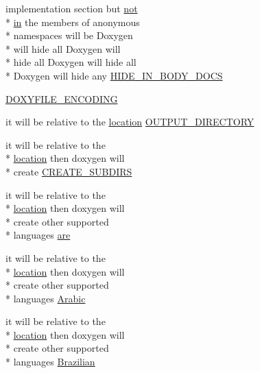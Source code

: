 \begin{DoxyCompactItemize}
implementation section but \hyperlink{uavobjecttemplate_8m_acf8758da9d0019183b0d213755711ee7}{not} \\*
\hyperlink{glext_8h_a83ad0ee7f1e06b59c90271716e689080}{in} the members of anonymous \\*
namespaces will be Doxygen \\*
will hide all Doxygen will \\*
hide all Doxygen will hide all \\*
Doxygen will hide any \hyperlink{sdlgamepad_8dox_aac21372812b1ce4b2d16b5121c56fff6}{H\-I\-D\-E\-\_\-\-I\-N\-\_\-\-B\-O\-D\-Y\-\_\-\-D\-O\-C\-S}
\item 
\hyperlink{sdlgamepad_8dox_ac50780facdab5a469895066bc087eea5}{D\-O\-X\-Y\-F\-I\-L\-E\-\_\-\-E\-N\-C\-O\-D\-I\-N\-G}
\item 
it will be relative to the \hyperlink{glext_8h_a6f0165ed903f22b8bb600c3e0b628e73}{location} \hyperlink{sdlgamepad_8dox_a0210526ada4ed067410fb4f078b8ae3f}{O\-U\-T\-P\-U\-T\-\_\-\-D\-I\-R\-E\-C\-T\-O\-R\-Y}
\item 
it will be relative to the \\*
\hyperlink{glext_8h_a6f0165ed903f22b8bb600c3e0b628e73}{location} then doxygen will \\*
create \hyperlink{sdlgamepad_8dox_a77f3c876623f3cbb5ed96ca49ce6fe06}{C\-R\-E\-A\-T\-E\-\_\-\-S\-U\-B\-D\-I\-R\-S}
\item 
it will be relative to the \\*
\hyperlink{glext_8h_a6f0165ed903f22b8bb600c3e0b628e73}{location} then doxygen will \\*
create other supported \\*
languages \hyperlink{sdlgamepad_8dox_a6d0965b20c4eb2235e8f9f5f0e5193ae}{are}
\item 
it will be relative to the \\*
\hyperlink{glext_8h_a6f0165ed903f22b8bb600c3e0b628e73}{location} then doxygen will \\*
create other supported \\*
languages \hyperlink{sdlgamepad_8dox_a09569d1a0354f8f4cabb5f3633abc16b}{Arabic}
\item 
it will be relative to the \\*
\hyperlink{glext_8h_a6f0165ed903f22b8bb600c3e0b628e73}{location} then doxygen will \\*
create other supported \\*
languages \hyperlink{sdlgamepad_8dox_a8e7728ba488d59bc2d1023e8f1325f11}{Brazilian}
\item 

\end{DoxyCompactItemize}
